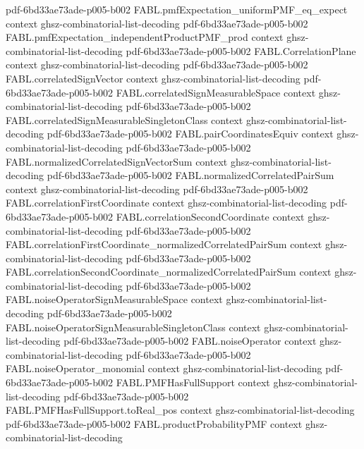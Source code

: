 \begin{theorem}
  {pdf-6bd33ae73ade-p005-b002}
\proofstep
  {FABL.pmfExpectation_uniformPMF_eq_expect}
  {context}
  {ghsz-combinatorial-list-decoding}
  {pdf-6bd33ae73ade-p005-b002}
\proofstep
  {FABL.pmfExpectation_independentProductPMF_prod}
  {context}
  {ghsz-combinatorial-list-decoding}
  {pdf-6bd33ae73ade-p005-b002}
\proofstep
  {FABL.CorrelationPlane}
  {context}
  {ghsz-combinatorial-list-decoding}
  {pdf-6bd33ae73ade-p005-b002}
\proofstep
  {FABL.correlatedSignVector}
  {context}
  {ghsz-combinatorial-list-decoding}
  {pdf-6bd33ae73ade-p005-b002}
\proofstep
  {FABL.correlatedSignMeasurableSpace}
  {context}
  {ghsz-combinatorial-list-decoding}
  {pdf-6bd33ae73ade-p005-b002}
\proofstep
  {FABL.correlatedSignMeasurableSingletonClass}
  {context}
  {ghsz-combinatorial-list-decoding}
  {pdf-6bd33ae73ade-p005-b002}
\proofstep
  {FABL.pairCoordinatesEquiv}
  {context}
  {ghsz-combinatorial-list-decoding}
  {pdf-6bd33ae73ade-p005-b002}
\proofstep
  {FABL.normalizedCorrelatedSignVectorSum}
  {context}
  {ghsz-combinatorial-list-decoding}
  {pdf-6bd33ae73ade-p005-b002}
\proofstep
  {FABL.normalizedCorrelatedPairSum}
  {context}
  {ghsz-combinatorial-list-decoding}
  {pdf-6bd33ae73ade-p005-b002}
\proofstep
  {FABL.correlationFirstCoordinate}
  {context}
  {ghsz-combinatorial-list-decoding}
  {pdf-6bd33ae73ade-p005-b002}
\proofstep
  {FABL.correlationSecondCoordinate}
  {context}
  {ghsz-combinatorial-list-decoding}
  {pdf-6bd33ae73ade-p005-b002}
\proofstep
  {FABL.correlationFirstCoordinate_normalizedCorrelatedPairSum}
  {context}
  {ghsz-combinatorial-list-decoding}
  {pdf-6bd33ae73ade-p005-b002}
\proofstep
  {FABL.correlationSecondCoordinate_normalizedCorrelatedPairSum}
  {context}
  {ghsz-combinatorial-list-decoding}
  {pdf-6bd33ae73ade-p005-b002}
\proofstep
  {FABL.noiseOperatorSignMeasurableSpace}
  {context}
  {ghsz-combinatorial-list-decoding}
  {pdf-6bd33ae73ade-p005-b002}
\proofstep
  {FABL.noiseOperatorSignMeasurableSingletonClass}
  {context}
  {ghsz-combinatorial-list-decoding}
  {pdf-6bd33ae73ade-p005-b002}
\proofstep
  {FABL.noiseOperator}
  {context}
  {ghsz-combinatorial-list-decoding}
  {pdf-6bd33ae73ade-p005-b002}
\proofstep
  {FABL.noiseOperator_monomial}
  {context}
  {ghsz-combinatorial-list-decoding}
  {pdf-6bd33ae73ade-p005-b002}
\proofstep
  {FABL.PMFHasFullSupport}
  {context}
  {ghsz-combinatorial-list-decoding}
  {pdf-6bd33ae73ade-p005-b002}
\proofstep
  {FABL.PMFHasFullSupport.toReal_pos}
  {context}
  {ghsz-combinatorial-list-decoding}
  {pdf-6bd33ae73ade-p005-b002}
\proofstep
  {FABL.productProbabilityPMF}
  {context}
  {ghsz-combinatorial-list-decoding}

\end{theorem}
